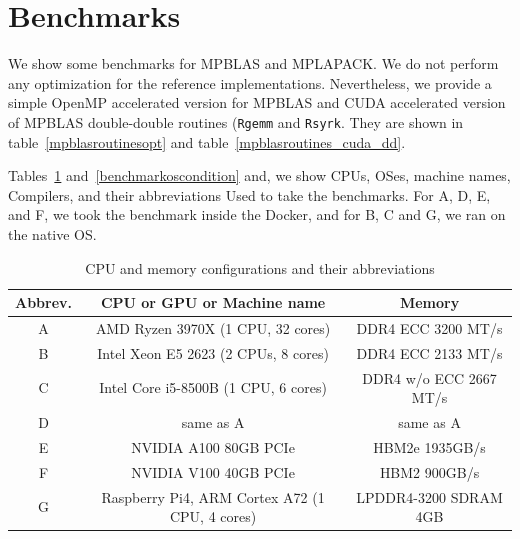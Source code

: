 \documentclass[12pt]{article}
\begin{document}
\section{Benchmarks}
\label{sec:benchmarks}
We show some benchmarks for MPBLAS and MPLAPACK. We do not perform any optimization for the reference implementations. Nevertheless,
we provide a simple OpenMP accelerated version for MPBLAS and CUDA accelerated version of MPBLAS double-double routines ({\tt Rgemm} and {\tt Rsyrk}. They are shown in table~\ref{mpblasroutinesopt} and table~\ref{mpblasroutines_cuda_dd}.

Tables~\ref{benchmarkcondition} and~\ref{benchmarkoscondition} and, we show CPUs, OSes, machine names, Compilers, and their abbreviations Used to take the benchmarks. For A, D, E, and F, we took the benchmark inside the Docker, and for B, C and G, we ran on the native OS.

\begin{table}
{\fontsize{8pt}\selectfont
\caption{CPU and memory configurations and their abbreviations}\label{benchmarkcondition}
\begin{center}
\begin{tabular}{c|c|c}
Abbrev.  &  CPU or GPU or Machine name        & Memory   \\ \hline
A  &  AMD Ryzen 3970X (1 CPU, 32 cores)       & DDR4 ECC 3200 MT/s \\
B  &  Intel Xeon E5 2623 (2 CPUs, 8 cores)    & DDR4 ECC 2133 MT/s  \\
C  &  Intel Core i5-8500B (1 CPU, 6 cores)    & DDR4 w/o ECC 2667 MT/s \\
D  &  same as A                               & same as A \\
E  &  NVIDIA A100 80GB PCIe                   & HBM2e 1935GB/s\\
F  &  NVIDIA V100 40GB PCIe                   & HBM2 900GB/s \\
G  &  Raspberry Pi4, ARM Cortex A72 (1 CPU, 4 cores) & LPDDR4-3200 SDRAM 4GB\\ \hline
\end{tabular}
\end{center}
}
\end{table}
\end{document}
